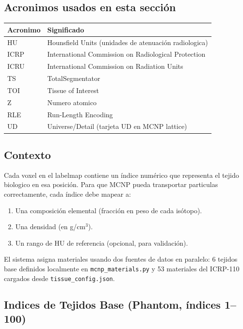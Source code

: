 \documentclass[12pt,a4paper]{article}
\begin{document}
\subsection*{Acronimos usados en esta sección}
\begin{tabular}{ll}
\toprule
\textbf{Acronimo} & \textbf{Significado} \\
\midrule
HU & Hounsfield Units (unidades de atenuación radiologica) \\
ICRP & International Commission on Radiological Protection \\
ICRU & International Commission on Radiation Units \\
TS & TotalSegmentator \\
TOI & Tissue of Interest \\
Z & Numero atomico \\
RLE & Run-Length Encoding \\
UD & Universe/Detail (tarjeta UD en MCNP lattice) \\
\bottomrule
\end{tabular}

\subsection{Contexto}

Cada voxel en el labelmap contiene un índice numérico que representa el tejido biologico en esa posición. Para que MCNP pueda transportar particulas correctamente, cada índice debe mapear a:

\begin{enumerate}
    \item Una composición elemental (fracción en peso de cada isótopo).
    \item Una densidad (en g/cm$^3$).
    \item Un rango de HU de referencia (opcional, para validación).
\end{enumerate}

El sistema asigna materiales usando dos fuentes de datos en paralelo: 6 tejidos base definidos localmente en \texttt{mcnp\_materials.py} y 53 materiales del ICRP-110 cargados desde \texttt{tissue\_config.json}.

\subsection{Indices de Tejidos Base (Phantom, índices 1--100)}
\end{document}
